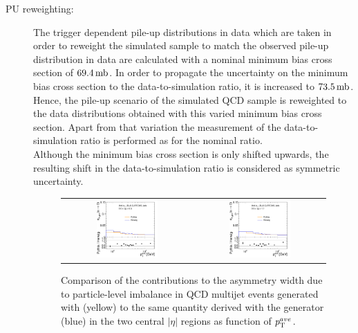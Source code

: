 \begin{description}
 \item[PU reweighting:] The trigger dependent pile-up distributions in data which are taken in order to reweight the simulated sample to match the observed pile-up distribution in data are calculated with a nominal minimum bias cross section of $69.4\,\rm{mb}$. In order to propagate the uncertainty on the minimum bias cross section to the data-to-simulation ratio, it is increased to $73.5\,\rm{mb}$. Hence, the pile-up scenario of the simulated \pythia QCD sample is reweighted to the data distributions obtained with this varied minimum bias cross section. Apart from that variation the measurement of the data-to-simulation ratio is performed as for the nominal ratio. \\
 Although the minimum bias cross section is only shifted upwards, the resulting shift in the data-to-simulation ratio is considered as symmetric uncertainty.

\begin{figure}[!tp]
  \centering
  \begin{tabular}{cc}
                \includegraphics[width=0.49\textwidth]{figures/PLI_comparison_Eta0_v4.pdf} &
                \includegraphics[width=0.49\textwidth]{figures/PLI_comparison_Eta1_v4.pdf} \\
  \end{tabular}
  \caption{Comparison of the contributions to the asymmetry width due to particle-level imbalance in QCD multijet events generated with \pythia (yellow) to the same quantity derived with the \herwig generator (blue) in the two central $|\eta|$ regions as function of $p_{\text{T}}^{ave}$.}
  \label{fig:pli_comp}
\end{figure}
 

\end{description}
